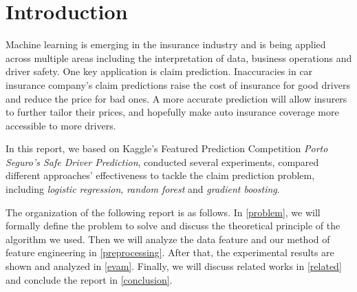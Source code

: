 \documentclass{standalone}
\begin{document}
\section{Introduction}


Machine learning is emerging in the insurance industry and is being applied
across multiple areas including the interpretation of data, business operations
and driver safety. One key application is claim prediction. Inaccuracies in car
insurance company's claim predictions raise the cost of insurance for good
drivers and reduce the price for bad ones. A more accurate prediction will
allow insurers to further tailor their prices, and hopefully make auto
insurance coverage more accessible to more drivers.

In this report, we based on Kaggle's Featured Prediction Competition
\emph{Porto Seguro's Safe Driver Prediction}\cite{kaggle}, conducted several
experiments, compared different approaches' effectiveness to tackle the claim
prediction problem, including \emph{logistic regression}, \emph{random forest} and \emph{gradient boosting}.

The organization of the following report is as follows. In \cref{problem}, we will
formally define the problem to solve and discuss the theoretical principle of
the algorithm we used. Then we will analyze the data feature and our method of
feature engineering in \cref{preprocessing}. After that, the experimental results are
shown and analyzed in \cref{evam}. Finally, we will discuss related works in \cref{related} and
conclude the report in \cref{conclusion}.
\end{document}
